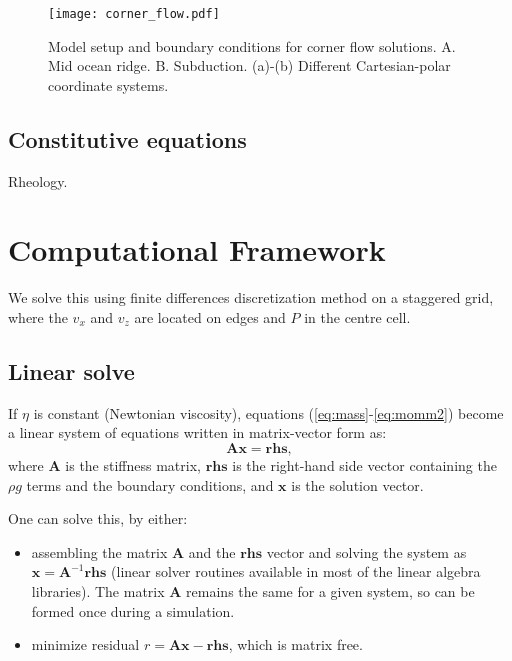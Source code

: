 \documentclass[a4paper,11pt]{article}
\begin{document}
\begin{figure}
\begin{center}
\noindent \texttt{[image: corner\_flow.pdf]} 
\caption{Model setup and boundary conditions for corner flow solutions. A. Mid ocean ridge. B. Subduction. (a)-(b) Different Cartesian-polar coordinate systems.}
\label{fig:corner_flow}
  \end{center}
\end{figure}

\subsection{Constitutive equations}
Rheology. 

\section{Computational Framework}

We solve this using finite differences discretization method on a staggered grid, where the $v_x$ and $v_z$ are located on edges and $P$ in the centre cell.

\subsection{Linear solve}
If $\eta$ is constant (Newtonian viscosity), equations (\ref{eq:mass}-\ref{eq:momm2}) become a linear system of equations written in matrix-vector form as:
\begin{equation}
\textbf{A} \textbf{x} = \textbf{rhs},
\end{equation}
where $\textbf{A}$ is the stiffness matrix, $\textbf{rhs}$ is the right-hand side vector containing the $\rho g$ terms and the boundary conditions, and $\textbf{x} $ is the solution vector. 

One can solve this, by either:
\begin{itemize} 
\item assembling the matrix $\textbf{A}$ and the $\textbf{rhs}$ vector and solving the system as $\textbf{x} = \textbf{A}^{-1}\textbf{rhs}$ (linear solver routines available in most of the linear algebra libraries). The matrix $\textbf{A}$ remains the same for a given system, so can be formed once during a simulation. 
\item minimize residual $r = \textbf{A} \textbf{x} - \textbf{rhs}$, which is matrix free.
\end{itemize}
\end{document}
